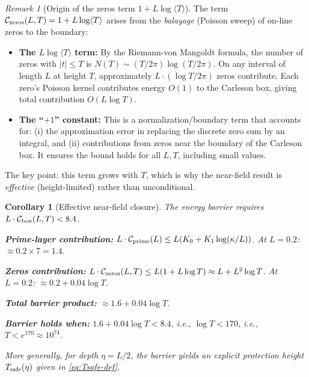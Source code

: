 \documentclass[11pt]{article}
\newtheorem{corollary}[theorem]{Corollary}
\theoremstyle{definition}
\theoremstyle{remark}
\newtheorem{remark}[theorem]{Remark}
\theoremstyle{definition}
\begin{document}
\begin{remark}[Origin of the zeros term $1 + L\log\langle T\rangle$]\label{rem:zeros-term-origin}
The term $\mathcal{C}_{\rm zeros}(L,T) = 1 + L\log\langle T\rangle$ arises from the \emph{balayage} (Poisson sweep) of on-line zeros to the boundary:
\begin{itemize}
\item \textbf{The $L\log\langle T\rangle$ term:} By the Riemann-von Mangoldt formula, the number of zeros with $|t| \le T$ is $N(T) \sim (T/2\pi)\log(T/2\pi)$. On any interval of length $L$ at height $T$, approximately $L \cdot (\log T / 2\pi)$ zeros contribute. Each zero's Poisson kernel contributes energy $O(1)$ to the Carleson box, giving total contribution $O(L \log T)$.
\item \textbf{The ``$+1$'' constant:} This is a normalization/boundary term that accounts for: (i) the approximation error in replacing the discrete zero sum by an integral, and (ii) contributions from zeros near the boundary of the Carleson box. It ensures the bound holds for all $L, T$, including small values.
\end{itemize}
The key point: this term grows with $T$, which is why the near-field result is \emph{effective} (height-limited) rather than unconditional.
\end{remark}

\begin{corollary}[Effective near-field closure]\label{cor:unconditional-closure}
The energy barrier requires $L \cdot \mathcal{C}_{\rm box}(L, T) < 8.4$.

\textbf{Prime-layer contribution:} $L \cdot \mathcal{C}_{\rm prime}(L) \le L(K_0 + K_1\log(\kappa/L))$.
At $L = 0.2$: $\approx 0.2 \times 7 = 1.4$.

\textbf{Zeros contribution:} $L \cdot \mathcal{C}_{\rm zeros}(L, T) \le L(1 + L\log T) \approx L + L^2\log T$.
At $L = 0.2$: $\approx 0.2 + 0.04\log T$.

\textbf{Total barrier product:} $\approx 1.6 + 0.04\log T$.

\textbf{Barrier holds when:} $1.6 + 0.04\log T < 8.4$, i.e., $\log T < 170$, i.e., $T < e^{170} \approx 10^{74}$.

More generally, for depth $\eta=L/2$, the barrier yields an explicit protection height $T_{\rm safe}(\eta)$ given in \eqref{eq:Tsafe-def}.
\end{corollary}
\end{document}
